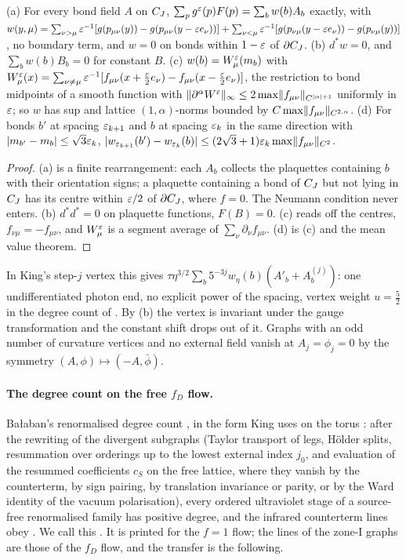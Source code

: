 \begin{lemma}\label{lem:a02:SBP}
(a) For every bond field $A$ on $C_J$, $\sum_pg^{\varepsilon}(p)F(p)=\sum_bw(b)A_b$ exactly, with $w(y,\mu)=\sum_{\nu>\mu}\varepsilon^{-1}[g(p_{\mu\nu}(y))-g(p_{\mu\nu}(y-\varepsilon e_\nu))]+\sum_{\nu<\mu}\varepsilon^{-1}[g(p_{\nu\mu}(y-\varepsilon e_\nu))-g(p_{\nu\mu}(y))]$, no boundary term, and $w=0$ on bonds within $1-\varepsilon$ of $\partial C_J$. (b) $d^*w=0$, and $\sum_bw(b)B_b=0$ for constant $B$. (c) $w(b)=W^{\varepsilon}_\mu(m_b)$ with $W^{\varepsilon}_\mu(x)=\sum_{\nu\ne\mu}\varepsilon^{-1}[f_{\mu\nu}(x+\frac{\varepsilon}2e_\nu)-f_{\mu\nu}(x-\frac{\varepsilon}2e_\nu)]$, the restriction to bond midpoints of a smooth function with $\lVert \partial^\alpha W^{\varepsilon}\rVert_\infty\le2\max\lVert f_{\mu\nu}\rVert_{C^{|\alpha|+1}}$ uniformly in $\varepsilon$; so $w$ has sup and lattice $(1,\alpha)$-norms bounded by $C\max\lVert f_{\mu\nu}\rVert_{C^{2,\alpha}}$. (d) For bonds $b'$ at spacing $\varepsilon_{k+1}$ and $b$ at spacing $\varepsilon_k$ in the same direction with $|m_{b'}-m_b|\le\sqrt3\varepsilon_k$, $|w_{\varepsilon_{k+1}}(b')-w_{\varepsilon_k}(b)|\le(2\sqrt3+1)\varepsilon_k\max\lVert f_{\mu\nu}\rVert_{C^2}$.
\end{lemma}
\begin{proof}
(a) is a finite rearrangement: each $A_b$ collects the plaquettes containing $b$ with their orientation signs; a plaquette containing a bond of $C_J$ but not lying in $C_J$ has its centre within $\varepsilon/2$ of $\partial C_J$, where $f=0$. The Neumann condition never enters. (b) $d^*d^*=0$ on plaquette functions, $F(B)=0$. (c) reads off the centres, $f_{\nu\mu}=-f_{\mu\nu}$, and $W^{\varepsilon}_\mu$ is a segment average of $\sum_\nu\partial_\nu f_{\mu\nu}$. (d) is (c) and the mean value theorem.
\end{proof}
In King's step-$j$ vertex \cite[(3.20)]{K1} this gives $\tau\eta^{3/2}\sum_b5^{-3j}w_\eta(b)(A'_b+A^{(j)}_b)$: one undifferentiated photon end, no explicit power of the spacing, vertex weight $u=\frac52$ in the degree count of \cite[(3.30)]{K1}. By (b) the vertex is invariant under the gauge transformation \cite[(3.46)]{K1} and the constant shift \cite[(3.43)--(3.45)]{K1} drops out of it. Graphs with an odd number of curvature vertices and no external field vanish at $A_j=\phi_j=0$ by the symmetry $(A,\phi)\mapsto(-A,\bar\phi)$.

\paragraph{The degree count on the free $f_D$ flow.} Ba{\l}aban's renormalised degree count \cite[Sect.~3, (3.5)]{Ba3}, in the form King uses on the torus \cite[Sect.~3.5, (3.77)--(3.78)]{K1}: after the rewriting of the divergent subgraphs (Taylor transport of legs, H\"older splits, resummation over orderings up to the lowest external index $j_0$, and evaluation of the resummed coefficients $c_S$ on the free lattice, where they vanish by the counterterm, by sign pairing, by translation invariance or parity, or by the Ward identity of the vacuum polarisation), every ordered ultraviolet stage of a source-free renormalised family has positive degree, and the infrared counterterm lines obey \cite[(3.78)]{K1}. We call this \DEG. It is printed for the $f=1$ flow; the lines of the zone-I graphs are those of the $f_D$ flow, and the transfer is the following.

